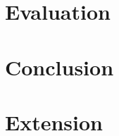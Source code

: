\documentclass[a4paper, 12pt]{article}
\begin{document}
\section*{Evaluation}

\section*{Conclusion}

\section*{Extension}

\printbibliography
\end{document}
